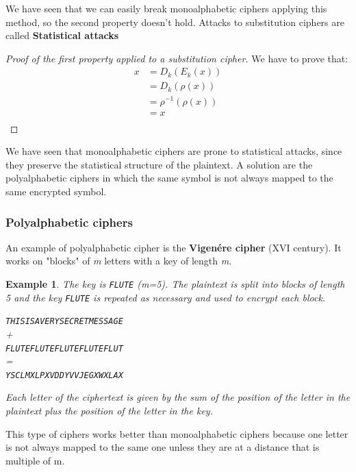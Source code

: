 \documentclass[a4paper, 12pt]{report}
\newtheorem{example}{\textbf{Example}}
\begin{document}
We have seen that we can easily break monoalphabetic ciphers applying this method, so the second property doesn't hold. Attacks to substitution ciphers are called \textbf{Statistical attacks}

\begin{proof}[Proof of the first property applied to a substitution cipher]
	We have to prove that:
	\setcounter{equation}{0}
	\begin{align}
		x &= D_k(E_k(x)) \\
		&=D_k(\rho(x)) \\
		&=\rho^{-1}(\rho(x)) \\
		&=x\\
	\end{align}
\end{proof}

We have seen that monoalphabetic ciphers are prone to statistical attacks, since they preserve the statistical structure of the plaintext. A solution are the polyalphabetic ciphers in which the same symbol is not always mapped to the same encrypted symbol.

\subsubsection{Polyalphabetic ciphers}
An example of polyalphabetic cipher is the \textbf{Vigenére cipher} (XVI century). It works on "blocks" of \textit{m} letters with a key of length \textit{m}.
\begin{example}
	The key is \texttt{FLUTE} (m=5). The plaintext is split into blocks of length 5 and the key \texttt{FLUTE} is repeated as necessary and used to encrypt each block.
	\begin{center}
		\texttt{THISISAVERYSECRETMESSAGE}\\
		+\\
		\texttt{FLUTEFLUTEFLUTEFLUTEFLUT}\\
		=\\
		\texttt{YSCLMXLPXVDDYVVJEGXWXLAX}
	\end{center}
	\vspace{5mm}
	Each letter of the ciphertext is given by the sum of the position of the letter in the plaintext plus the position of the letter in the key.
\end{example}
This type of ciphers works better than monoalphabetic ciphers because one letter is not always mapped to the same one unless they are at a distance that is multiple of m.\\
\end{document}
